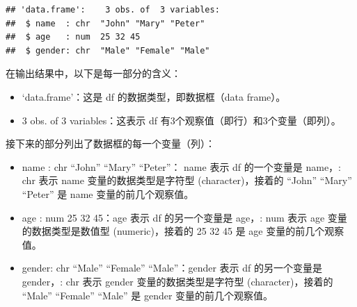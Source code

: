 \documentclass[]{book}
\newenvironment{Shaded}{\begin{snugshade}}{\end{snugshade}}
\newcommand{\CommentTok}[1]{\textcolor[rgb]{0.56,0.35,0.01}{\textit{#1}}}
\newcommand{\DataTypeTok}[1]{\textcolor[rgb]{0.13,0.29,0.53}{#1}}
\newcommand{\DecValTok}[1]{\textcolor[rgb]{0.00,0.00,0.81}{#1}}
\newcommand{\KeywordTok}[1]{\textcolor[rgb]{0.13,0.29,0.53}{\textbf{#1}}}
\newcommand{\NormalTok}[1]{#1}
\newcommand{\OperatorTok}[1]{\textcolor[rgb]{0.81,0.36,0.00}{\textbf{#1}}}
\begin{document}
\begin{verbatim}
## 'data.frame':    3 obs. of  3 variables:
##  $ name  : chr  "John" "Mary" "Peter"
##  $ age   : num  25 32 45
##  $ gender: chr  "Male" "Female" "Male"
\end{verbatim}

在输出结果中，以下是每一部分的含义：

\begin{itemize}
\item
  `data.frame'：这是 df 的数据类型，即数据框（data frame）。
\item
  3 obs. of 3 variables：这表示 df 有3个观察值（即行）和3个变量（即列）。
\end{itemize}

接下来的部分列出了数据框的每一个变量（列）：

\begin{itemize}
\item
  name : chr ``John'' ``Mary'' ``Peter''： name 表示 df 的一个变量是 name，: chr 表示 name 变量的数据类型是字符型 (character)，接着的 ``John'' ``Mary'' ``Peter'' 是 name 变量的前几个观察值。
\item
  age : num 25 32 45：age 表示 df 的另一个变量是 age，: num 表示 age 变量的数据类型是数值型 (numeric)，接着的 25 32 45 是 age 变量的前几个观察值。
\item
  gender: chr ``Male'' ``Female'' ``Male''：gender 表示 df 的另一个变量是 gender，: chr 表示 gender 变量的数据类型是字符型 (character)，接着的 ``Male'' ``Female'' ``Male'' 是 gender 变量的前几个观察值。
\end{itemize}

\begin{Shaded}
\end{Shaded}
\end{document}
